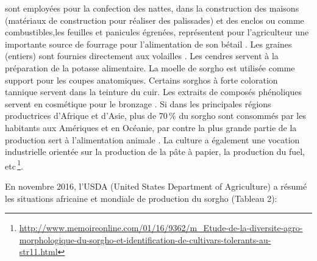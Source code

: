 \documentclass[a4paper,11pt]{article}
\begin{document}
sont employées pour la confection des nattes, dans la construction des
maisons (matériaux de construction pour réaliser des palissades) et
des enclos ou comme combustibles,les feuilles et panicules égrenées,
représentent pour l'agriculteur une importante source de fourrage pour
l'alimentation de son bétail \cite{Chantereau_1991}. Les graines
(entiers) sont fournies directement aux volailles
\cite{SaintClair_1989}. Les cendres servent à la préparation de la
potasse alimentaire. La moelle de sorgho est utilisée comme support
pour les coupes anatomiques. Certains sorghos à forte coloration
tannique servent dans la teinture du cuir. Les extraits de composés
phénoliques servent en cosmétique pour le bronzage
\cite{BARRO_KONDOMBO_2010}. Si dans les principales régions
productrices d'Afrique et d'Asie, plus de 70\,\% du sorgho sont
consommés par les habitants aux Amériques et en Océanie, par contre la
plus grande partie de la production sert à l'alimentation animale
\cite{BARRO_KONDOMBO_2010}. La culture a également une vocation
industrielle orientée sur la production de la pâte à papier, la
production du fuel,
etc\,\footnote{\url{http://www.memoireonline.com/01/16/9362/m_Etude-de-la-diversite-agro-morphologique-du-sorgho-et-identification-de-cultivars-tolerants-au-str11.html}}.

En novembre 2016, l'USDA (United States Department of Agriculture) a résumé les situations africaine et mondiale de production du sorgho (Tableau 2):


\end{document}
